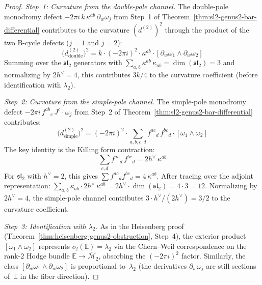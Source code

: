 \begin{proof}
\emph{Step~1: Curvature from the double-pole channel.}\enspace
The double-pole monodromy defect
$-2\pi i\, k\, \kappa^{ab}\, \partial_w\omega_j$
from Step~1 of
Theorem~\ref{thm:sl2-genus2-bar-differential}
contributes to the curvature $(d^{(2)})^2$ through the
product of the two B-cycle defects ($j = 1$ and $j = 2$):
\begin{equation}\label{eq:double-pole-curvature}
\bigl(d^{(2)}_{\mathrm{double}}\bigr)^2
= k \cdot (-2\pi i)^2 \cdot
 \kappa^{ab} \cdot [\partial_w\omega_1 \wedge \partial_w\omega_2]
\end{equation}
Summing over the $\mathfrak{sl}_2$ generators with
$\sum_{a,b} \kappa^{ab}\, \kappa_{ab} = \dim(\mathfrak{sl}_2) = 3$
and normalizing by $2h^\vee = 4$, this contributes
$3k/4$ to the curvature coefficient (before identification with
$\lambda_2$).

\emph{Step~2: Curvature from the simple-pole channel.}
The simple-pole monodromy defect
$-2\pi i\, f^{ab}{}_c\, J^c \cdot \omega_j$ from
Step~2 of Theorem~\ref{thm:sl2-genus2-bar-differential}
contributes:
\begin{equation}\label{eq:simple-pole-curvature}
\bigl(d^{(2)}_{\mathrm{simple}}\bigr)^2
= (-2\pi i)^2 \cdot
 \sum_{a,b,c,d} f^{ac}{}_d\, f^{bc}{}_d \cdot
 [\omega_1 \wedge \omega_2]
\end{equation}
The key identity is the Killing form contraction:
\begin{equation}\label{eq:killing-contraction}
\sum_{c,d} f^{ac}{}_d\, f^{bc}{}_d = 2h^\vee\, \kappa^{ab}
\end{equation}
For $\mathfrak{sl}_2$ with $h^\vee = 2$, this gives
$\sum f^{ac}{}_d f^{bc}{}_d = 4\,\kappa^{ab}$.
After tracing over the adjoint representation:
$\sum_{a,b} \kappa_{ab} \cdot 2h^\vee\, \kappa^{ab}
= 2h^\vee \cdot \dim(\mathfrak{sl}_2) = 4 \cdot 3 = 12$.
Normalizing by $2h^\vee = 4$, the simple-pole channel
contributes $3 \cdot h^\vee / (2h^\vee) = 3/2$ to the
curvature coefficient.

\emph{Step~3: Identification with $\lambda_2$.}
As in the Heisenberg proof
(Theorem~\ref{thm:heisenberg-genus2-obstruction}, Step~4),
the exterior product $[\omega_1 \wedge \omega_2]$ represents
$c_2(\mathbb{E}) = \lambda_2$ via the Chern--Weil correspondence
on the rank-$2$ Hodge bundle $\mathbb{E} \to
\overline{\mathcal{M}}_2$, absorbing the
$(-2\pi i)^2$ factor. Similarly, the class
$[\partial_w\omega_1 \wedge \partial_w\omega_2]$ is proportional
to~$\lambda_2$ (the derivatives $\partial_w\omega_j$ are
still sections of~$\mathbb{E}$ in the fiber direction).


\end{proof}
